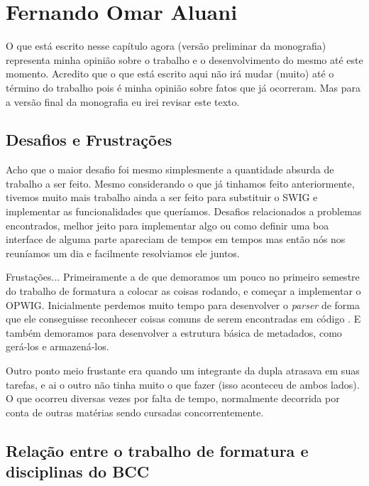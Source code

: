 \chapter{Fernando Omar Aluani}
\label{sec:omar_subjetiva}

\begin{framed}
  O que está escrito nesse capítulo agora (versão preliminar da monografia) 
  representa minha opinião sobre o trabalho e o desenvolvimento do mesmo
  até este momento. Acredito que o que está escrito aqui não irá mudar (muito)
  até o término do trabalho pois é minha opinião sobre fatos que já ocorreram.
  Mas para a versão final da monografia eu irei revisar este texto.
\end{framed}

\section{Desafios e Frustrações}
\label{sec:omar:desafios_frustracoes}

Acho que o maior desafio foi mesmo simplesmente a quantidade absurda de trabalho a
ser feito. Mesmo considerando o que já tinhamos feito anteriormente, tivemos muito
mais trabalho ainda a ser feito para substituir o SWIG e implementar as funcionalidades
que queríamos. Desafios relacionados a problemas encontrados, melhor jeito para
implementar algo ou como definir uma boa interface de alguma parte apareciam de
tempos em tempos mas então nós nos reuníamos um dia e facilmente resolviamos ele juntos.

Frustações... Primeiramente a de que demoramos um pouco no primeiro semestre do 
trabalho de formatura a colocar as coisas rodando, e começar a implementar o 
OPWIG. Inicialmente perdemos muito tempo para desenvolver o \textit{parser}
de forma que ele conseguisse reconhecer coisas comuns de serem encontradas
em código \CXX{}. E também demoramos para desenvolver a estrutura básica de 
metadados, como gerá-los e armazená-los.

Outro ponto meio frustante era quando um integrante da dupla atrasava em suas tarefas,
e ai o outro não tinha muito o que fazer (isso aconteceu de ambos lados). O que
ocorreu diversas vezes por falta de tempo, normalmente decorrida por conta de
outras matérias sendo cursadas concorrentemente.

\section{Relação entre o trabalho de formatura e disciplinas do BCC}
\label{sec:omar:relacao_disciplinas_bcc}

